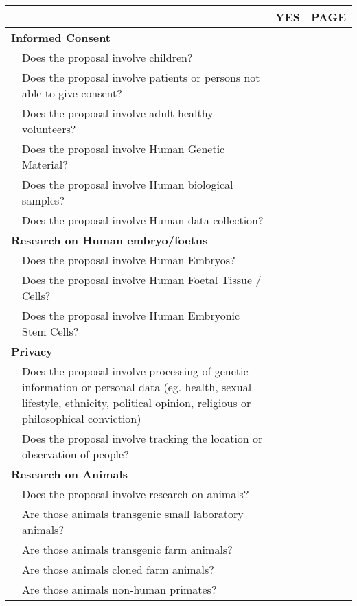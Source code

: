\documentclass[a4paper,11pt,twoside]{scrreprt}
\begin{document}
\begin{small}
\begin{tabular}{|p{1em}p{11cm}|l|l|}\hline
  \multicolumn{2}{|l|}{{\strut}} & 
 {YES} & 
  {PAGE}\\\hline 
 \multicolumn{2}{|l|}{\bf{Informed Consent}} & & \\\hline
  & Does the proposal involve children?  & & \\\hline
  & Does the proposal involve patients or persons not able to give consent? & & \\\hline
  & Does the proposal involve adult healthy volunteers? & & \\\hline
  & Does the proposal involve Human Genetic Material? & & \\\hline
  & Does the proposal involve Human biological samples? & & \\\hline
  & Does the proposal involve Human data collection? & & \\\hline
  \multicolumn{2}{|l|}{\bf{Research on Human embryo/foetus}}  & & \\\hline
  & Does the proposal involve Human Embryos? & & \\\hline
  & Does the proposal involve Human Foetal Tissue / Cells? & & \\\hline
  & Does the proposal involve Human Embryonic Stem Cells? & & \\\hline
  \multicolumn{2}{|l|}{\bf{Privacy}} & & \\\hline
  & Does the proposal involve processing of genetic information 
         or personal data (eg. health, sexual lifestyle, ethnicity, 
         political opinion, religious or philosophical conviction)  & & \\\hline 
  & Does the proposal involve tracking the location or observation 
         of people? & & \\\hline 
  \multicolumn{2}{|l|}{\bf{Research on Animals}} & & \\\hline 
  & Does the proposal involve research on animals? & & \\\hline 
  & Are those animals transgenic small laboratory animals? & & \\\hline 
  & Are those animals transgenic farm animals? & & \\\hline 
  & Are those animals cloned farm animals? & & \\\hline 
  & Are those animals non-human primates?  & & \\\hline 

\end{tabular}
\end{small}
\end{document}
